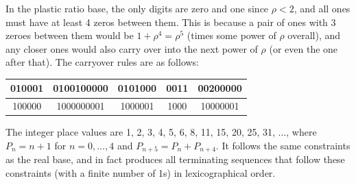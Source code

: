\documentclass{article}
\begin{document}
In the plastic ratio base,
the only digits are zero and one since $\rho < 2$,
and all ones must have at least 4 zeros between them.
This is because a pair of ones with 3 zeroes between them
would be $1+\rho^4=\rho^5$ (times some power of $\rho$ overall),
and any closer ones would also carry over into the next power of $\rho$
(or even the one after that).
The carryover rules are as follows:
\begin{center}
  \begin{tabular}{|c|c|c|c|c|}
    \hline
    010001 & 0100100000 & 0101000 & 0011 & 00200000 \\ \hline
    100000 & 1000000001 & 1000001 & 1000 & 10000001 \\ \hline  
  \end{tabular}
\end{center}
The integer place values are 1, 2, 3, 4, 5, 6, 8, 11, 15, 20, 25, 31, $\ldots$,
where $P_n=n+1$ for $n=0, \ldots, 4$ and $P_{n+5}=P_n+P_{n+4}$.
It follows the same constraints as the real base,
and in fact produces all terminating sequences that follow these constraints
(with a finite number of 1s) in lexicographical order.
\end{document}
